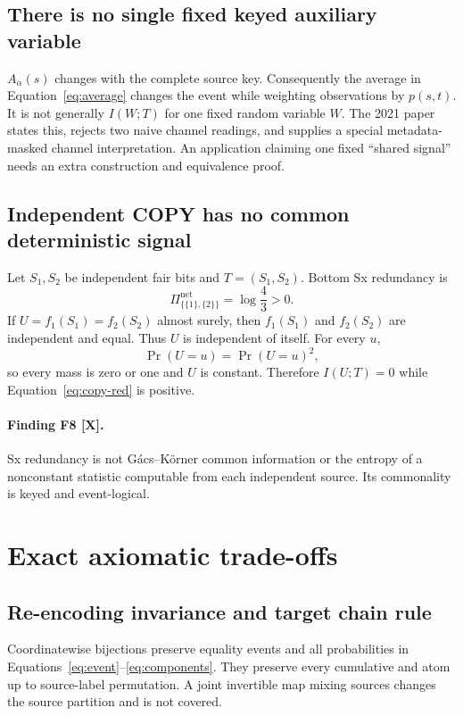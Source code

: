 \documentclass[11pt]{article}
\newcommand{\evidence}[1]{\textbf{[#1]}}
\begin{document}
\subsection{There is no single fixed keyed auxiliary variable}

$A_\alpha(s)$ changes with the complete source key.  Consequently the average
in Equation~\eqref{eq:average} changes the event while weighting observations
by $p(s,t)$.  It is not generally $I(W;T)$ for one fixed random variable $W$.
The 2021 paper states this, rejects two naive channel readings, and supplies a
special metadata-masked channel interpretation.  An application claiming one
fixed ``shared signal'' needs an extra construction and equivalence proof.

\subsection{Independent COPY has no common deterministic signal}

Let $S_1,S_2$ be independent fair bits and $T=(S_1,S_2)$.  Bottom Sx
redundancy is
\begin{equation}
\Pi_{\{\{1\},\{2\}\}}^{\mathrm{net}}=\log\frac43>0.
\label{eq:copy-red}
\end{equation}
If $U=f_1(S_1)=f_2(S_2)$ almost surely, then $f_1(S_1)$ and $f_2(S_2)$ are
independent and equal.  Thus $U$ is independent of itself.  For every $u$,
\[
\Pr(U=u)=\Pr(U=u)^2,
\]
so every mass is zero or one and $U$ is constant.  Therefore $I(U;T)=0$ while
Equation~\eqref{eq:copy-red} is positive.

\paragraph{Finding F8 \evidence{X}.}
Sx redundancy is not G\'acs--K\"orner common information or the entropy of a
nonconstant statistic computable from each independent source.  Its commonality
is keyed and event-logical.

\section{Exact axiomatic trade-offs}

\subsection{Re-encoding invariance and target chain rule}

Coordinatewise bijections preserve equality events and all probabilities in
Equations~\eqref{eq:event}--\eqref{eq:components}.  They preserve every
cumulative and atom up to source-label permutation.  A joint invertible map
mixing sources changes the source partition and is not covered.
\end{document}
